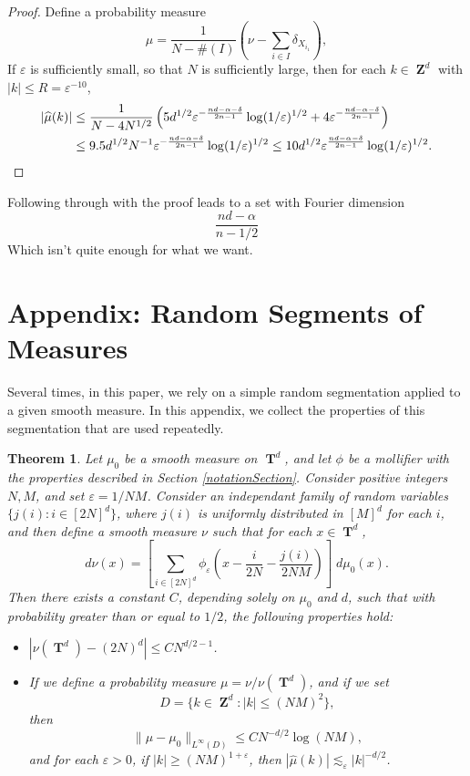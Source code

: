 \documentclass[12pt,reqno]{article}
\DeclareMathOperator{\ZZ}{\mathbf{Z}}
\DeclareMathOperator{\TT}{\mathbf{T}}
\newtheorem{theorem}{Theorem}
\begin{document}
\begin{proof}
    Define a probability measure
    \[ \mu = \frac{1}{N - \#(I)} \left( \nu - \sum_{i \in I} \delta_{X_{i_1}} \right), \]
    If $\varepsilon$ is sufficiently small, so that $N$ is sufficiently large, then for each $k \in \ZZ^d$ with $|k| \leq R = \varepsilon^{-10}$,
    \begin{align*}
        |\widehat{\mu}(k)| &\leq \frac{1}{N - 4N^{1/2}} \left( 5d^{1/2} \varepsilon^{- \frac{nd - \alpha - \delta}{2n - 1}} \log(1/\varepsilon)^{1/2} +  4 \varepsilon^{- \frac{nd - \alpha - \delta}{2n - 1}} \right)\\
        &\leq 9.5 d^{1/2} N^{-1} \varepsilon^{- \frac{nd - \alpha - \delta}{2n - 1}} \log(1/\varepsilon)^{1/2} \leq 10 d^{1/2} \varepsilon^{\frac{nd - \alpha - \delta}{2n - 1}} \log(1/\varepsilon)^{1/2}. \qedhere
    \end{align*}
\end{proof}

Following through with the proof leads to a set with Fourier dimension
%
\[ \frac{nd - \alpha}{n - 1/2} \]
%
Which isn't quite enough for what we want.



\section{Appendix: Random Segments of Measures}

Several times, in this paper, we rely on a simple random segmentation applied to a given smooth measure. In this appendix, we collect the properties of this segmentation that are used repeatedly.

\begin{theorem}
    Let $\mu_0$ be a smooth measure on $\TT^d$, and let $\phi$ be a mollifier with the properties described in Section \ref{notationSection}. Consider positive integers $N, M$, and set $\varepsilon = 1/NM$. Consider an independant family of random variables $\{ j(i) : i \in [2N]^d \}$, where $j(i)$ is uniformly distributed in $[M]^d$ for each $i$, and then define a smooth measure $\nu$ such that for each $x \in \TT^d$,
    \[ d\nu(x) = \left[ \sum_{i \in [2N]^d} \phi_\varepsilon \left( x - \frac{i}{2N} - \frac{j(i)}{2NM} \right) \right]\; d\mu_0(x). \]
    Then there exists a constant $C$, depending solely on $\mu_0$ and $d$, such that with probability greater than or equal to $1/2$, the following properties hold:
    \begin{itemize}
        \item $|\nu(\TT^d) - (2N)^d| \leq C N^{d/2 - 1}$.

        \item If we define a probability measure $\mu = \nu / \nu(\TT^d)$, and if we set
        \[ D = \{ k \in \ZZ^d : |k| \leq (NM)^2 \}, \]
        then
        \[ \| \mu - \mu_0 \|_{L^\infty(D)} \leq C N^{-d/2} \log(NM), \]
        and for each $\varepsilon > 0$, if $|k| \geq (NM)^{1+\varepsilon}$, then $|\widehat{\mu}(k)| \lesssim_\varepsilon |k|^{-d/2}$.
    \end{itemize}
\end{theorem}
\end{document}
